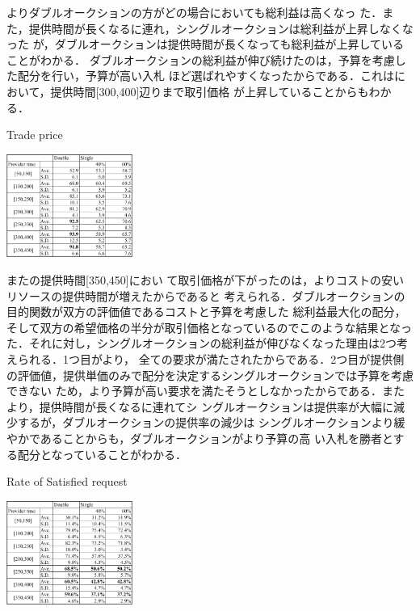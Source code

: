\documentclass{ujarticle}
\begin{document}
よりダブルオークションの方がどの場合においても総利益は高くなっ
た．また，提供時間が長くなるに連れ，シングルオークションは総利益が上昇しなくなった
が，ダブルオークションは提供時間が長くなっても総利益が上昇していることがわかる．
ダブルオークションの総利益が伸び続けたのは，予算を考慮した配分を行い，予算が高い入札
ほど選ばれやすくなったからである．これはにおいて，提供時間[300,400]辺りまで取引価格
が上昇していることからもわかる．

\begin{table}[H]
  \caption{Trade price}
  \centering
  \includegraphics[width=0.31\textwidth]{trade.pdf} 
  \label{tab:trade}
\end{table}

またの提供時間[350,450]におい
て取引価格が下がったのは，よりコストの安いリソースの提供時間が増えたからであると
考えられる．ダブルオークションの目的関数が双方の評価値であるコストと予算を考慮した
総利益最大化の配分，そして双方の希望価格の半分が取引価格となっているのでこのような結果となった．それに対し，シングルオークションの総利益が伸びなくなった理由は2つ考えられる．1つ目がより，
全ての要求が満たされたからである．2つ目が提供側の評価値，提供単価のみで配分を決定するシングルオークションでは予算を考慮できない
ため，より予算が高い要求を満たそうとしなかったからである．またより，提供時間が長くなるに連れてシ
ングルオークションは提供率が大幅に減少するが，ダブルオークションの提供率の減少は
シングルオークションより緩やかであることからも，ダブルオークションがより予算の高
い入札を勝者とする配分となっていることがわかる．

\begin{table}[H]
  \caption{Rate of Satisfied request}
  \centering
  \includegraphics[width=0.31\textwidth]{request_rate.pdf} 
  \label{tab:request_rate}
\end{table}
\end{document}
